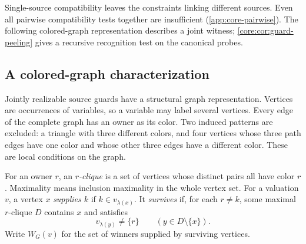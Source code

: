 



Single-source compatibility leaves the constraints linking different
sources. Even all pairwise compatibility tests together are insufficient
(\cref{app:core-pairwise}). The following colored-graph representation
describes a joint witness; \cref{core:cor:guard-peeling} gives a recursive
recognition test on the canonical probes.



\subsection{A colored-graph characterization}
\label{app:core-colored-graphs}

Jointly realizable source guards have a structural graph representation.
Vertices are occurrences of variables, so a variable may label several
vertices. Every edge of the complete graph has an owner as its color.
Two induced patterns are excluded: a triangle with three different colors,
and four vertices whose three path edges have one color and whose other
three edges have a different color. These are local conditions on the graph.

For an owner $r$, an \emph{$r$-clique} is a set of vertices whose distinct
pairs all have color $r$. Maximality means inclusion maximality in the
whole vertex set. For a valuation $v$, a vertex $x$ \emph{supplies $k$} if
$k\in v_{\lambda(x)}$. It \emph{survives} if, for each $r\ne k$, some
maximal $r$-clique $D$ contains $x$ and satisfies
\[
  v_{\lambda(y)}\ne\{r\}\qquad(y\in D\setminus\{x\}).
\]
Write $W_G(v)$ for the set of winners supplied by surviving vertices.

